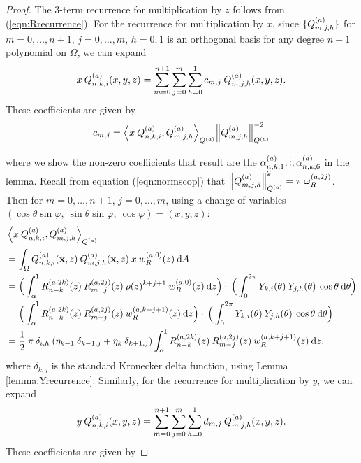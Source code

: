\documentclass[11pt, oneside]{article}   	%
\begin{document}
\begin{proof}
The 3-term recurrence for multiplication by $z$ follows from (\ref{eqn:Rrecurrence}). For the recurrence for multiplication by $x$, since $\{Q_{m,j,h}^{(a)}\}$ for $m = 0,\dots,n+1$, $j = 0,\dots,m$, $h = 0,1$ is an orthogonal basis for any degree $n+1$ polynomial on $\Omega$, we can expand 
\begin{align*}
	x \: Q_{n,k,i}^{(a)}(x,y,z) = \sum_{m=0}^{n+1} \sum_{j=0}^m \sum_{h=0}^1 c_{m,j} \: Q_{m,j,h}^{(a)}(x,y,z).
\end{align*}
These coefficients are given by
\begin{align*}
	c_{m,j} = {\ip< x \: \scopnkia, \scopmjha >_{\scopa}}{\norm{\scopmjha}^{-2}_{\scopa}}
\end{align*}
where we show the non-zero coefficients that result are the $\alpha^{(a)}_{n,k,1},\vdots,\alpha^{(a)}_{n,k,6}$ in the lemma.
Recall from equation (\ref{eqn:normscop}) that $\left\| Q_{m,j,h}^{(a)} \right\|_{Q^{(a)}}^2 = \pi \: \omega_R^{(a,2j)}$. Then for $m = 0,\dots,n+1$, $j = 0,\dots,m$, using a change of variables $(\cos\theta \sin\varphi, \: \sin\theta\sin\varphi, \: \cos\varphi) = (x, y, z)$:
\begin{align*}
	&\ip<x \: \scopnkia, \scopmjha>_{\scopa} \\
	&= \int_\Omega \scopnkia(\xvec,z) \: \scopmjha(\xvec,z) \: x \: \genjacw^{(a,0)}(z) \: \D A \\
	&= \Big( \int^1_\alpha \genjacnmk^{(a, 2k)}(z) \: \genjacmmj^{(a, 2j)}(z) \: \rho(z)^{k+j+1} \: \genjacw^{(a, 0)}(z) \: \D z \Big) \cdot \: \Big( \int_0^{2\pi} \chki(\theta) \: \chjh(\theta) \: \cos\theta \: \D \theta \Big) \\
	&= \Big( \int^1_\alpha \genjacnmk^{(a, 2k)}(z) \: \genjacmmj^{(a, 2j)}(z) \: \genjacw^{(a, k + j + 1)}(z) \: \D z \Big) \cdot \: \Big( \int_0^{2\pi} \chki(\theta) \: \chjh(\theta) \: \cos\theta \: \D \theta \Big) \\
	&= \half \: \pi \: \delta_{i,h} \: (\eta_{k-1} \: \delta_{k-1, j} + \eta_{k} \: \delta_{k+1, j})  \int^1_\alpha \genjacnmk^{(a, 2k)}(z) \: \genjacmmj^{(a, 2j)}(z) \: \genjacw^{(a, k + j + 1)}(z) \: \D z.
\end{align*}
where $\delta_{k, j}$ is the standard Kronecker delta function, using Lemma \ref{lemma:Yrecurrence}. Similarly, for the recurrence for multiplication by $y$, we can expand 
\begin{align*}
	y \: Q_{n,k,i}^{(a)}(x,y,z) = \sum_{m=0}^{n+1} \sum_{j=0}^m \sum_{h=0}^1 d_{m,j} \: Q_{m,j,h}^{(a)}(x,y,z).
\end{align*}
These coefficients are given by

\end{proof}
\end{document}
